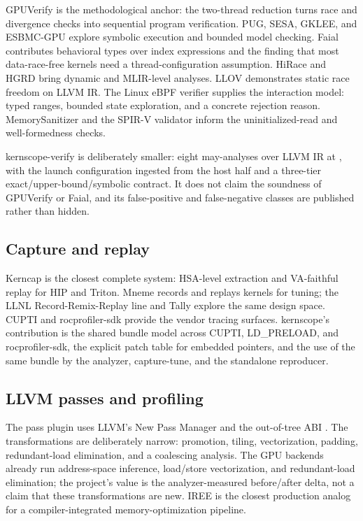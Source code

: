 GPUVerify \citep{gpuverify2012,gpuverify2015} is the methodological anchor:
the two-thread reduction turns race and divergence checks into sequential
program verification. PUG, SESA, GKLEE, and ESBMC-GPU
\citep{pug2010,sesa2014,gklee2012,esbmcgpu2017} explore symbolic execution and
bounded model checking. Faial \citep{faial2024} contributes behavioral types
over index expressions and the finding that most data-race-free kernels need a
thread-configuration assumption. HiRace and HGRD
\citep{hirace2024,hgrd2026} bring dynamic and MLIR-level analyses. LLOV
\citep{llov2020} demonstrates static race freedom on LLVM IR. The Linux eBPF
verifier \citep{ebpfVerifier} supplies the interaction model: typed ranges,
bounded state exploration, and a concrete rejection reason. MemorySanitizer
\citep{msan2015} and the SPIR-V validator \citep{spirvSpec} inform the
uninitialized-read and well-formedness checks.

kernscope-verify is deliberately smaller: eight may-analyses over LLVM IR at
, with the launch configuration ingested from the host half and a
three-tier exact/upper-bound/symbolic contract. It does not claim the
soundness of GPUVerify or Faial, and its false-positive and false-negative
classes are published rather than hidden.

\subsection{Capture and replay}
\label{sec:prior-capture}

Kerncap \citep{kerncap2026} is the closest complete system: HSA-level
extraction and VA-faithful replay for HIP and Triton. Mneme \citep{mneme2023}
records and replays kernels for tuning; the LLNL Record-Remix-Replay line
\citep{r3-2026} and Tally \citep{tally2024} explore the same design space.
CUPTI \citep{cupti} and rocprofiler-sdk \citep{rocprofilerSDK} provide the
vendor tracing surfaces. kernscope's contribution is the shared bundle model
across CUPTI, LD\_PRELOAD, and rocprofiler-sdk, the explicit patch table for
embedded pointers, and the use of the same bundle by the analyzer,
capture-tune, and the standalone reproducer.

\subsection{LLVM passes and profiling}
\label{sec:prior-pass}

The pass plugin uses LLVM's New Pass Manager and the out-of-tree
 ABI \citep{llvm2004,mlirCGO2021}. The
transformations are deliberately narrow: promotion, tiling, vectorization,
padding, redundant-load elimination, and a coalescing analysis. The GPU
backends already run address-space inference, load/store vectorization, and
redundant-load elimination; the project's value is the analyzer-measured
before/after delta, not a claim that these transformations are new. IREE
\citep{iree} is the closest production analog for a compiler-integrated
memory-optimization pipeline.

